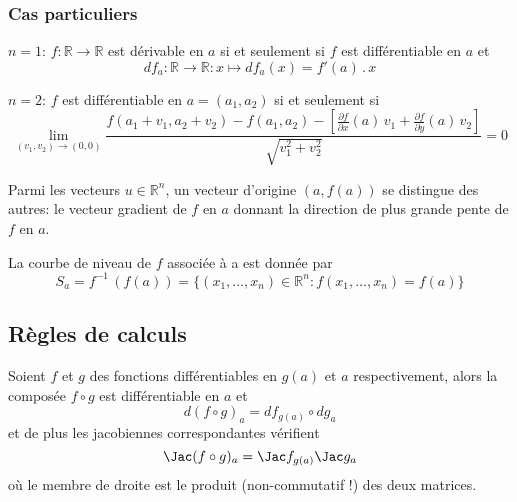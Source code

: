 \subsubsection*{Cas particuliers} \begin{description} \item $n=1$:
$f: \mathbb{R}\rightarrow \mathbb{R}$ est dérivable en $a$ si et
seulement si $f$ est différentiable en $a$ et
$$df_a:\mathbb{R}\rightarrow \mathbb{R}: x \mapsto df_a(x) =
f'(a)\,.\,x$$ \item $n=2$: $f$ est différentiable en $a =(a_1, a_2)$
si et seulement si
$$\lim_{(v_1,v_2)\rightarrow (0,0)} \frac{f(a_1+v_1, a_2+v_2) - f(a_1,a_2) - [ \frac{\partial f}{\partial x}(a)\,v_1+
\frac{\partial f}{\partial y}(a)\,v_2]}{\sqrt{v_1^2+v_2^2}} = 0
$$\end{description}\vspace{0.3cm}


Parmi les vecteurs $u \in \mathbb{R}^n$, un vecteur d'origine $(a,
f(a))$ se distingue des autres: le vecteur gradient de $f$ en $a$
donnant la direction de plus grande pente de $f$ en
$a$.\vspace{0.3cm}


\begin{definition}
La courbe de niveau de $f$ associée à a est donnée par
$$ S_a = f^{-1}\,(f(a)) = \{(x_1, \ldots, x_n)\in \mathbb{R}^n : f(x_1, \ldots,
x_n)=f(a) \}$$
\end{definition}

\subsection{Règles de calculs}

\begin{proposition} Soient $f$ et $g$ des fonctions
  différentiables en $g(a)$ et $a$ respectivement, alors la composée
  $f\circ g$ est différentiable en $a$ et
  \begin{equation*}
    d (f\circ g)_a = d f_{g(a)} \circ d g_a
  \end{equation*}
  et de plus les jacobiennes correspondantes vérifient
  \begin{equation*}
    \Jac (f\circ g)_a = \Jac f_{g(a)} \Jac g_a
  \end{equation*}
  où le membre de droite est le produit (non-commutatif !) des deux matrices.
\end{proposition}

